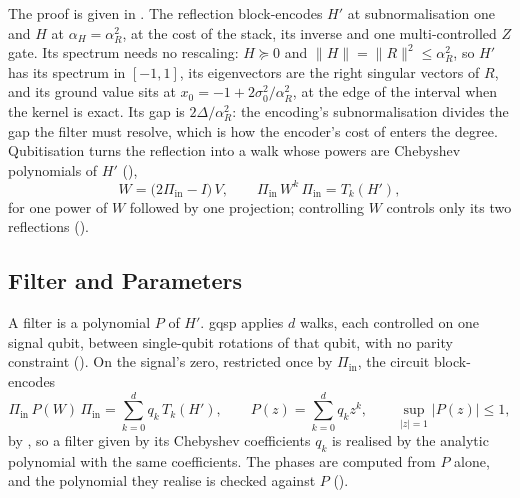 The proof is given in . The reflection block-encodes $H'$ at subnormalisation one and $H$ at $\alpha_H=\alpha_R^2$, at the cost of the stack, its inverse and one multi-controlled $Z$ gate. Its spectrum needs no rescaling: $H\succeq0$ and $\|H\|=\|R\|^2\le\alpha_R^2$, so $H'$ has its spectrum in $[-1,1]$, its eigenvectors are the right singular vectors of $R$, and its ground value sits at $x_0=-1+2\sigma_0^2/\alpha_R^2$, at the edge of the interval when the kernel is exact. Its gap is $2\Delta/\alpha_R^2$: the encoding's subnormalisation divides the gap the filter must resolve, which is how the encoder's cost of  enters the degree. Qubitisation \cite{lowchuang2019qubitization} turns the reflection into a walk whose powers are Chebyshev polynomials of $H'$ (),
\begin{equation}
    W=\bigl(2\Pi_{\mathrm{in}}-I\bigr)\,V,
    \qquad
    \Pi_{\mathrm{in}}\,W^{k}\,\Pi_{\mathrm{in}}=T_k(H') ,
    \label{eq:walk}
\end{equation}
for one power of $W$ followed by one projection; controlling $W$ controls only its two reflections ().

\subsection{Filter and Parameters}
\label{sec:pipeline-filter}

A filter is a polynomial $P$ of $H'$. \Gls{gqsp} \cite{motlagh2024gqsp} applies $d$ walks, each controlled on one signal qubit, between single-qubit rotations of that qubit, with no parity constraint (). On the signal's zero, restricted once by $\Pi_{\mathrm{in}}$, the circuit block-encodes
\begin{equation}
    \Pi_{\mathrm{in}}\,P(W)\,\Pi_{\mathrm{in}}=\sum_{k=0}^{d}q_k\,T_k(H'),
    \qquad
    P(z)=\sum_{k=0}^{d}q_kz^k,
    \qquad
    \sup_{|z|=1}|P(z)|\le1,
    \label{eq:gqsp-block}
\end{equation}
by , so a filter given by its Chebyshev coefficients $q_k$ is realised by the analytic polynomial with the same coefficients. The phases are computed from $P$ alone, and the polynomial they realise is checked against $P$ ().

